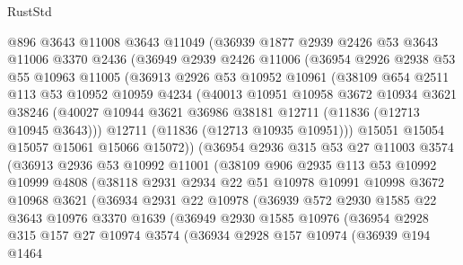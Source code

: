 \begin{lexlean}{RustStd}
\begin{coremodule}
    @896
    @3643
    @11008
    @3643
    @11049
    (@36939
      @1877
      @2939
      @2426
      @53
      @3643
      @11006
      @3370
      @2436
      (@36949
        @2939
        @2426
        @11006
        (@36954
          @2926
          @2938
          @53
          @55
          @10963
          @11005
          (@36913
            @2926
            @53
            @10952
            @10961
            (@38109
              @654
              @2511
              @113
              @53
              @10952
              @10959
              @4234
              (@40013
                @10951
                @10958
                @3672
                @10934
                @3621
                @38246
                (@40027 @10944 @3621 @36986 @38181 @12711 (@11836 (@12713 @10945 @3643)))
                @12711
                (@11836 (@12713 @10935 @10951)))
              @15051
              @15054
              @15057
              @15061
              @15066
              @15072))
          (@36954
            @2936
            @315
            @53
            @27
            @11003
            @3574
            (@36913
              @2936
              @53
              @10992
              @11001
              (@38109
                @906
                @2935
                @113
                @53
                @10992
                @10999
                @4808
                (@38118
                  @2931
                  @2934
                  @22
                  @51
                  @10978
                  @10991
                  @10998
                  @3672
                  @10968
                  @3621
                  (@36934
                    @2931
                    @22
                    @10978
                    (@36939
                      @572
                      @2930
                      @1585
                      @22
                      @3643
                      @10976
                      @3370
                      @1639
                      (@36949
                        @2930
                        @1585
                        @10976
                        (@36954
                          @2928
                          @315
                          @157
                          @27
                          @10974
                          @3574
                          (@36934
                            @2928
                            @157
                            @10974
                            (@36939
                              @194
                              @1464

\end{coremodule}
\end{lexlean}
